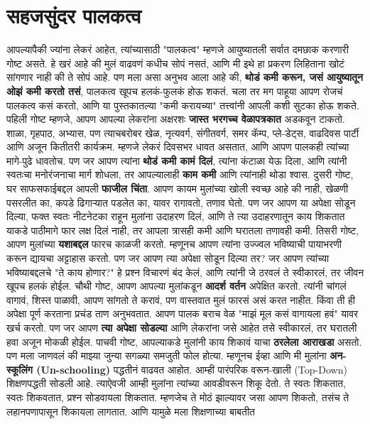  \chapter{सहजसुंदर पालकत्व}
आपल्यापैकी ज्यांना लेकरं आहेत, त्यांच्यासाठी "पालकत्व" म्हणजे आयुष्यातली सर्वात दमछाक करणारी गोष्ट असते. हे खरं आहे की मुलं वाढवणं कधीच सोपं नसतं, आणि मी इथे हा प्रकरण लिहिताना खोटं सांगणार नाही की ते सोपं आहे.
पण मला असा अनुभव आला आहे की, \textbf{थोडं कमी करून, जसं आयुष्यातून ओझं कमी करतो तसं}, 
 पालकत्व खूपच हलकं-फुलकं होऊ शकतं.
चला तर मग पाहूया आपण रोजचं पालकत्व कसं करतो, आणि या पुस्तकातल्या "कमी करायच्या" तत्त्वांनी आपली कशी सुटका होऊ शकते.
पहिली गोष्ट म्हणजे,  आपण आपल्या लेकरांना अक्षरशः \textbf{जास्त भरगच्च वेळापत्रकात} अडकवून टाकतो. शाळा, गृहपाठ, अभ्यास, पण त्याचबरोबर खेळ, नृत्यवर्ग, संगीतवर्ग, समर कॅम्प, प्ले-डेट्स, वाढदिवस पार्टी आणि अजून कितीतरी कार्यक्रम. म्हणजे लेकरं दिवसभर धावत असतात, आणि आपण पालकही त्यांच्या मागे-पुढे धावतोच. पण जर आपण त्यांना \textbf{थोडं कमी कामं दिलं}, त्यांना कंटाळा येऊ दिला, आणि त्यांनी स्वतःचा मनोरंजनाचा मार्ग शोधला, तर आपल्यालाही \textbf{काम कमी} आणि त्यांनाही थोडा श्वास.
दुसरी गोष्ट,  घर साफसफाईबद्दल आपली \textbf{फाजील चिंता}. आपण कायम मुलांच्या खोली स्वच्छ आहे की नाही, खेळणी पसरलीत का, कपडे ढिगाऱ्यात पडलेत का,  यावर रागावतो, तणाव घेतो. पण जर आपण या अपेक्षा सोडून दिल्या, फक्त स्वतः नीटनेटका राहून मुलांना उदाहरण दिलं, आणि ते त्या उदाहरणातून काय शिकतात याकडे पाठीमागे फार लक्ष दिलं नाही,  तर आपला त्रासही कमी आणि घरातला तणावही कमी.
तिसरी गोष्ट,  आपण मुलांच्या \textbf{यशाबद्दल} फारच काळजी करतो. म्हणूनच आपण त्यांना उज्ज्वल भविष्याची पायाभरणी करून द्यायचा अट्टाहास करतो. पण जर आपण त्या अपेक्षा सोडून दिल्या तर? जर आपण त्यांच्या भविष्याबद्दलचे "ते काय होणार?" हे प्रश्न विचारणं बंद केलं, आणि त्यांनी जे ठरवलं ते स्वीकारलं,  तर जीवन खूपच हलकं होईल.
चौथी गोष्ट,  आपण आपल्या मुलांकडून \textbf{आदर्श वर्तन} अपेक्षित करतो. त्यांनी चांगलं वागावं, शिस्त पाळावी, आपण सांगतो ते करावं,  पण वास्तवात मुलं फारसं असं करत नाहीत. किंवा ती ही अपेक्षा पूर्ण करताना प्रचंड ताण अनुभवतात. आपण पालक बराच वेळ "माझं मूल कसं वागायला हवं" यावर खर्च करतो. पण जर आपण \textbf{त्या अपेक्षा सोडल्या} आणि लेकरांना जसे आहेत तसे स्वीकारलं, तर घरातली हवा अजून मोकळी होईल.
पाचवी गोष्ट,  आपल्याकडे मुलांनी काय शिकावं याचा \textbf{ठरलेला आराखडा} असतो. पण मला जाणवलं की माझ्या जुन्या सगळ्या समजुती फोल होत्या. म्हणूनच ईव्हा आणि मी मुलांना \textbf{अन-स्कूलिंग (Un-schooling)} पद्धतीनं वाढवत आहोत.
आम्ही पारंपरिक वरून-खाली (Top-Down) शिक्षणपद्धती सोडली आहे. त्याऐवजी आम्ही मुलांना त्यांच्या आवडीवरून शिकू देतो. ते स्वतः शिकतात, स्वतः शिकवतात, प्रश्न सोडवायला शिकतात. म्हणजेच ते मोठं झाल्यावर
 जसा आपण शिकतो,  तसंच ते लहानपणापासून शिकायला लागतात. आणि यामुळे मला शिक्षणाच्या बाबतीत
